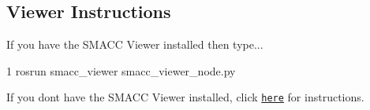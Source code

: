 \subsection*{Viewer Instructions}

If you have the S\+M\+A\+CC Viewer installed then type...


\begin{DoxyCode}
1 rosrun smacc\_viewer smacc\_viewer\_node.py
\end{DoxyCode}


If you don\textquotesingle{}t have the S\+M\+A\+CC Viewer installed, click \href{http://smacc.ninja/smacc-viewer/}{\tt here} for instructions. 